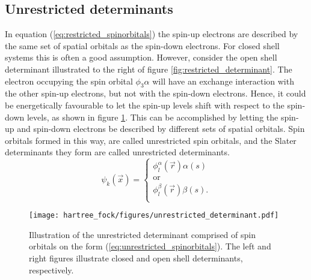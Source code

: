 \subsection{Unrestricted determinants}
In equation (\ref{eq:restricted_spinorbitals}) the spin-up electrons are described by the same set of spatial orbitals as the spin-down electrons.
For closed shell systems this is often a good assumption.
However, consider the open shell determinant illustrated to the right of figure \ref{fig:restricted_determinant}. The electron occupying the spin orbital 
$\phi_3\alpha$ will have an exchange interaction with the other spin-up electrons, but not with the spin-down electrons.
Hence, it could be energetically favourable to let the spin-up levels shift with respect to the spin-down levels, as shown in figure \ref{fig:unrestricted_determinant}.
This can be accomplished by letting the spin-up and spin-down electrons be described by different sets of spatial orbitals.
Spin orbitals formed in this way, are called unrestricted spin orbitals, and the Slater determinants they form are called unrestricted determinants.
\begin{equation}
\label{eq:unrestricted_spinorbitals}
\psi_k(\vec x) = \left\{\begin{array}{c} \phi^\alpha_l(\vec r)\alpha(s) \\
                                          \text{or} \\
                                          \phi^\beta_l(\vec r)\beta(s). \\
                       \end{array}\right.
\end{equation}
\begin{figure}
 \begin{center}
  \texttt{[image: hartree\_fock/figures/unrestricted\_determinant.pdf]}
  \caption{Illustration of the unrestricted determinant comprised of spin orbitals on the form (\ref{eq:unrestricted_spinorbitals}).
  The left and right figures illustrate closed and open shell determinants, respectively.}
  \label{fig:unrestricted_determinant}
 \end{center}
\end{figure}


